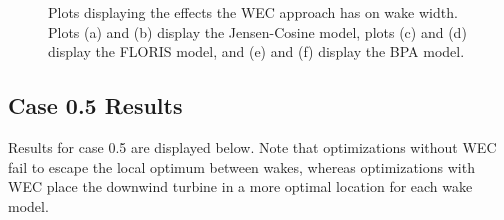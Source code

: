 \documentclass[a4paper]{jpconf}
\begin{document}
\begin{figure}[H]
{    }
    \caption{Plots displaying the effects the WEC approach has on wake width. Plots (a) and (b) display the Jensen-Cosine model, plots (c) and (d) display the FLORIS model, and (e) and (f) display the BPA model.}
    \label{fig:WECAEPFigures}
\end{figure}

\subsection{Case 0.5 Results}

Results for case 0.5 are displayed below. Note that optimizations without WEC fail to escape the local optimum between wakes, whereas optimizations with WEC place the downwind turbine in a more optimal location for each wake model.
\end{document}
